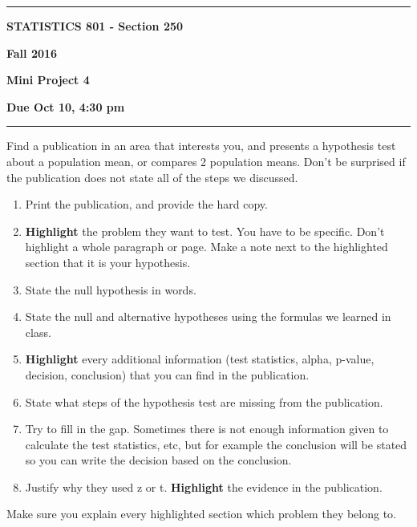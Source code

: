 \documentclass[12pt]{article}
\begin{document}
\hrule
\medskip
\centerline{\textbf{STATISTICS 801 - Section 250}}\hfill \textbf{Fall 2016}
\centerline{\textbf{Mini Project 4}}
\centerline{\textbf{Due Oct 10, 4:30 pm}}
\smallskip
\hrule
 Find a publication in an area that interests you, and presents a hypothesis test about a population mean, or compares 2 population means. Don't be surprised if the publication does not state all of the steps we discussed.
\begin{enumerate}
\item Print the publication, and provide the hard copy.
\item \textbf{Highlight} the problem they want to test. You have to be specific. Don't highlight a whole paragraph or page. Make a note next to the highlighted section that it is your hypothesis. 
\item State the null hypothesis in words.
\item State the null and alternative hypotheses using the formulas we learned in class.
\item \textbf{Highlight} every additional information (test statistics, alpha, p-value, decision, conclusion) that you can find in the publication.
\item State what steps of the hypothesis test are missing from the publication.
\item Try to fill in the gap. Sometimes there is not enough information given to calculate the test statistics, etc, but for example the conclusion will be stated so you can write the decision based on the conclusion. 
\item Justify why they used z or t. \textbf{Highlight} the evidence in the publication.
\end{enumerate}
Make sure you explain every highlighted section which problem they belong to.
\end{document}
